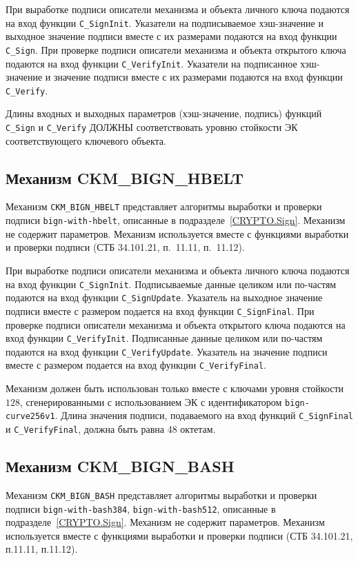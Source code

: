 При выработке подписи описатели механизма и объекта
личного ключа подаются на вход функции \verb|C_SignInit|.
Указатели на подписываемое хэш-значение и выходное значение подписи
вместе с их размерами подаются на вход функции \verb|C_Sign|.
При проверке подписи описатели механизма и объекта
открытого ключа подаются на вход функции \verb|C_VerifyInit|.
Указатели на подписанное хэш-значение и значение подписи
вместе с их размерами подаются на вход функции \verb|C_Verify|.

Длины входных и выходных параметров (хэш-значение, подпись) функций
\verb|C_Sign| и \verb|C_Verify| ДОЛЖНЫ соответствовать
уровню стойкости ЭК соответствующего ключевого объекта.

\subsection{Механизм CKM\_BIGN\_HBELT}

Механизм
\verb|CKM_BIGN_HBELT| представляет алгоритмы выработки и проверки
подписи \texttt{bign-with-hbelt}, описанные в подразделе~\ref{CRYPTO.Sign}.
Механизм не содержит параметров. Механизм используется вместе с функциями 
выработки и проверки подписи (СТБ 34.101.21, п.~11.11, п.~11.12).

При выработке подписи описатели механизма и объекта
личного ключа подаются на вход функции \verb|C_SignInit|.
Подписываемые данные целиком или по-частям подаются
на вход функции \verb|C_SignUpdate|.
Указатель на выходное значение подписи вместе с размером
подается на вход функции \verb|C_SignFinal|.
При проверке подписи описатели механизма и объекта
открытого ключа подаются на вход функции \verb|C_VerifyInit|.
Подписанные данные целиком или по-частям подаются
на вход функции \verb|C_VerifyUpdate|.
Указатель на значение подписи вместе с размером
подается на вход функции \verb|C_VerifyFinal|.

Механизм должен быть использован только вместе с ключами
уровня стойкости $128$, сгенерированными с использованием 
ЭК с идентификатором \verb|bign-curve256v1|.
Длина значения подписи, подаваемого на вход функций
\verb|C_SignFinal| и \verb|C_VerifyFinal|, должна быть равна
48 октетам.

\subsection{Механизм CKM\_BIGN\_BASH}

Механизм
\verb|CKM_BIGN_BASH| представляет алгоритмы выработки и проверки
подписи \texttt{bign-with-bash384}, \texttt{bign-with-bash512},
описанные в подразделе~\ref{CRYPTO.Sign}.
Механизм не содержит параметров.
Механизм используется вместе с функциями выработки и
проверки подписи (СТБ 34.101.21, п.11.11, п.11.12).

